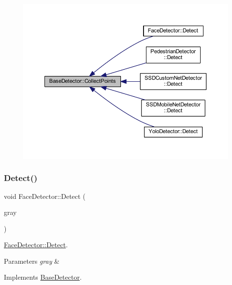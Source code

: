 \begin{figure}[H]
\begin{center}
\leavevmode
\includegraphics[width=350pt]{class_base_detector_a20380b0980c6f262b0829f37fb89d2a7_icgraph}
\end{center}
\end{figure}
\mbox{\label{class_face_detector_a4b9210a00283d5bf394c6188e3e0ab39}} 
\subsubsection{\texorpdfstring{Detect()}{Detect()}}
{\footnotesize\ttfamily void Face\+Detector\+::\+Detect (\begin{DoxyParamCaption}\item[{cv\+::\+U\+Mat \&}]{gray }\end{DoxyParamCaption})\hspace{0.3cm}{\ttfamily [virtual]}}



\mbox{\hyperlink{class_face_detector_a4b9210a00283d5bf394c6188e3e0ab39}{Face\+Detector\+::\+Detect}}. 


\begin{DoxyParams}{Parameters}
{\em gray} & \\
\hline
\end{DoxyParams}


Implements \mbox{\hyperlink{class_base_detector_a9c9dedfffb7673fd2995f24bdb9ade18}{Base\+Detector}}.



